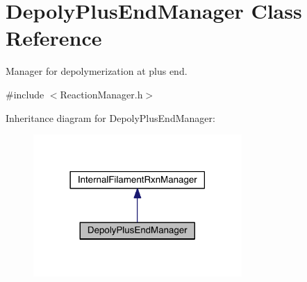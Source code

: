 \hypertarget{classDepolyPlusEndManager}{\section{Depoly\+Plus\+End\+Manager Class Reference}
\label{classDepolyPlusEndManager}
}


Manager for depolymerization at plus end.  




{\ttfamily \#include $<$Reaction\+Manager.\+h$>$}



Inheritance diagram for Depoly\+Plus\+End\+Manager\+:\nopagebreak
\begin{figure}[H]
\begin{center}
\leavevmode
\includegraphics[width=225pt]{classDepolyPlusEndManager__inherit__graph}
\end{center}
\end{figure}


